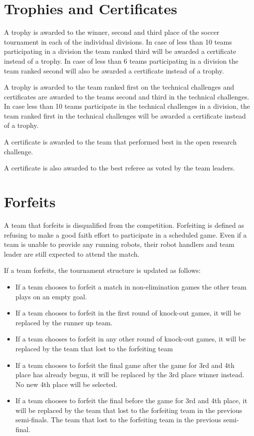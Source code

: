 \documentclass[12pt]{article}
\begin{document}
	\section{Trophies and Certificates}
	
	A trophy is awarded to the winner, second and third place of the soccer tournament in each of the individual divisions. In case of less than 10 teams participating in a division the team ranked third will be awarded a certificate instead	of a trophy. In case of less than 6 teams participating in a division the team ranked second will also be awarded a certificate instead of a trophy.
	
	A trophy is awarded to the team ranked first on the technical challenges and certificates
	are awarded to the teams second and third in the technical challenges. In case less than 10 teams participate in the technical challenges in a division, the team ranked first in the technical challenges will be awarded a certificate instead of a trophy. 
	
	
	A certificate is awarded to the team that performed best in the open research challenge.
	
	A certificate is also awarded to the best referee as voted by the team leaders.
	
	\section{Forfeits}
	A team that forfeits is disqualified from the competition. Forfeiting is defined as refusing to make a good faith effort to participate in a scheduled game. Even if a team is unable to provide any running robots, their robot handlers and team leader are still expected to attend the match.
	
	If a team forfeits, the tournament structure is updated as follows:
	
	\begin{itemize}
		\item If a team chooses to forfeit a match in non-elimination games the other team plays on an empty goal.
		\item  If a team chooses to forfeit in the first round of knock-out games, it will be replaced by the runner up team.
		\item If a team chooses to forfeit in any other round of knock-out games, it will be replaced by the team that lost to the forfeiting team
		\item If a team chooses to forfeit the final game after the game for 3rd and 4th place has already begun, it will be replaced by the 3rd place winner instead. No new 4th place will be selected.
		\item   If a team chooses to forfeit the final before the game for 3rd and 4th place, it will be replaced by the team	that lost to the forfeiting team in the previous semi-finals. The team that lost to the forfeiting team in the previous semi-final.
	\end{itemize}
\end{document}
